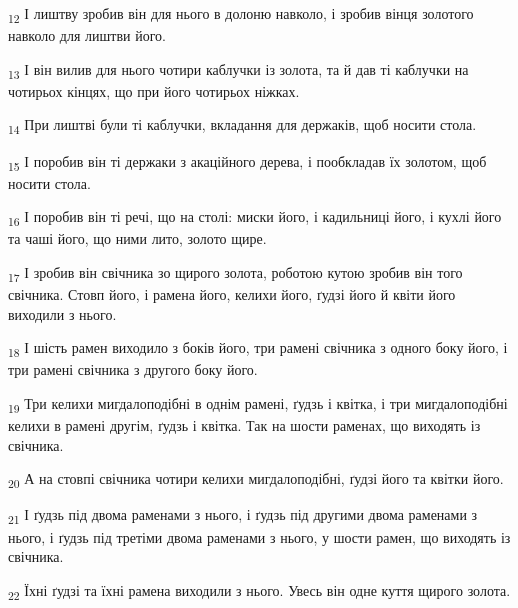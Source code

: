 \begin{tcolorbox}
\textsubscript{12} І лиштву зробив він для нього в долоню навколо, і зробив вінця золотого навколо для лиштви його.
\end{tcolorbox}
\begin{tcolorbox}
\textsubscript{13} І він вилив для нього чотири каблучки із золота, та й дав ті каблучки на чотирьох кінцях, що при його чотирьох ніжках.
\end{tcolorbox}
\begin{tcolorbox}
\textsubscript{14} При лиштві були ті каблучки, вкладання для держаків, щоб носити стола.
\end{tcolorbox}
\begin{tcolorbox}
\textsubscript{15} І поробив він ті держаки з акаційного дерева, і пообкладав їх золотом, щоб носити стола.
\end{tcolorbox}
\begin{tcolorbox}
\textsubscript{16} І поробив він ті речі, що на столі: миски його, і кадильниці його, і кухлі його та чаші його, що ними лито, золото щире.
\end{tcolorbox}
\begin{tcolorbox}
\textsubscript{17} І зробив він свічника зо щирого золота, роботою кутою зробив він того свічника. Стовп його, і рамена його, келихи його, ґудзі його й квіти його виходили з нього.
\end{tcolorbox}
\begin{tcolorbox}
\textsubscript{18} І шість рамен виходило з боків його, три рамені свічника з одного боку його, і три рамені свічника з другого боку його.
\end{tcolorbox}
\begin{tcolorbox}
\textsubscript{19} Три келихи мигдалоподібні в однім рамені, ґудзь і квітка, і три мигдалоподібні келихи в рамені другім, ґудзь і квітка. Так на шости раменах, що виходять із свічника.
\end{tcolorbox}
\begin{tcolorbox}
\textsubscript{20} А на стовпі свічника чотири келихи мигдалоподібні, ґудзі його та квітки його.
\end{tcolorbox}
\begin{tcolorbox}
\textsubscript{21} І ґудзь під двома раменами з нього, і ґудзь під другими двома раменами з нього, і ґудзь під третіми двома раменами з нього, у шости рамен, що виходять із свічника.
\end{tcolorbox}
\begin{tcolorbox}
\textsubscript{22} Їхні ґудзі та їхні рамена виходили з нього. Увесь він одне куття щирого золота.
\end{tcolorbox}
